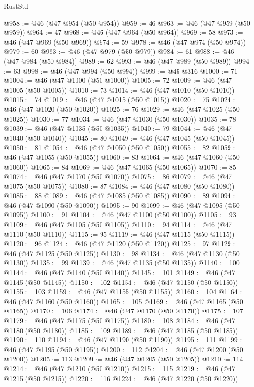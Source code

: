 \begin{lexlean}{RustStd}
\begin{coremodule}
{\begin{coremodule}
{{{{{{{{{{{{{{@958 := @46 (@47 @954 (@50 @954))
@959 := 46
@963 := @46 (@47 @959 (@50 @959))
@964 := 47
@968 := @46 (@47 @964 (@50 @964))
@969 := 58
@973 := @46 (@47 @969 (@50 @969))
@974 := 59
@978 := @46 (@47 @974 (@50 @974))
@979 := 60
@983 := @46 (@47 @979 (@50 @979))
@984 := 61
@988 := @46 (@47 @984 (@50 @984))
@989 := 62
@993 := @46 (@47 @989 (@50 @989))
@994 := 63
@998 := @46 (@47 @994 (@50 @994))
@999 := @46 @316
@1000 := 71
@1004 := @46 (@47 @1000 (@50 @1000))
@1005 := 72
@1009 := @46 (@47 @1005 (@50 @1005))
@1010 := 73
@1014 := @46 (@47 @1010 (@50 @1010))
@1015 := 74
@1019 := @46 (@47 @1015 (@50 @1015))
@1020 := 75
@1024 := @46 (@47 @1020 (@50 @1020))
@1025 := 76
@1029 := @46 (@47 @1025 (@50 @1025))
@1030 := 77
@1034 := @46 (@47 @1030 (@50 @1030))
@1035 := 78
@1039 := @46 (@47 @1035 (@50 @1035))
@1040 := 79
@1044 := @46 (@47 @1040 (@50 @1040))
@1045 := 80
@1049 := @46 (@47 @1045 (@50 @1045))
@1050 := 81
@1054 := @46 (@47 @1050 (@50 @1050))
@1055 := 82
@1059 := @46 (@47 @1055 (@50 @1055))
@1060 := 83
@1064 := @46 (@47 @1060 (@50 @1060))
@1065 := 84
@1069 := @46 (@47 @1065 (@50 @1065))
@1070 := 85
@1074 := @46 (@47 @1070 (@50 @1070))
@1075 := 86
@1079 := @46 (@47 @1075 (@50 @1075))
@1080 := 87
@1084 := @46 (@47 @1080 (@50 @1080))
@1085 := 88
@1089 := @46 (@47 @1085 (@50 @1085))
@1090 := 89
@1094 := @46 (@47 @1090 (@50 @1090))
@1095 := 90
@1099 := @46 (@47 @1095 (@50 @1095))
@1100 := 91
@1104 := @46 (@47 @1100 (@50 @1100))
@1105 := 93
@1109 := @46 (@47 @1105 (@50 @1105))
@1110 := 94
@1114 := @46 (@47 @1110 (@50 @1110))
@1115 := 95
@1119 := @46 (@47 @1115 (@50 @1115))
@1120 := 96
@1124 := @46 (@47 @1120 (@50 @1120))
@1125 := 97
@1129 := @46 (@47 @1125 (@50 @1125))
@1130 := 98
@1134 := @46 (@47 @1130 (@50 @1130))
@1135 := 99
@1139 := @46 (@47 @1135 (@50 @1135))
@1140 := 100
@1144 := @46 (@47 @1140 (@50 @1140))
@1145 := 101
@1149 := @46 (@47 @1145 (@50 @1145))
@1150 := 102
@1154 := @46 (@47 @1150 (@50 @1150))
@1155 := 103
@1159 := @46 (@47 @1155 (@50 @1155))
@1160 := 104
@1164 := @46 (@47 @1160 (@50 @1160))
@1165 := 105
@1169 := @46 (@47 @1165 (@50 @1165))
@1170 := 106
@1174 := @46 (@47 @1170 (@50 @1170))
@1175 := 107
@1179 := @46 (@47 @1175 (@50 @1175))
@1180 := 108
@1184 := @46 (@47 @1180 (@50 @1180))
@1185 := 109
@1189 := @46 (@47 @1185 (@50 @1185))
@1190 := 110
@1194 := @46 (@47 @1190 (@50 @1190))
@1195 := 111
@1199 := @46 (@47 @1195 (@50 @1195))
@1200 := 112
@1204 := @46 (@47 @1200 (@50 @1200))
@1205 := 113
@1209 := @46 (@47 @1205 (@50 @1205))
@1210 := 114
@1214 := @46 (@47 @1210 (@50 @1210))
@1215 := 115
@1219 := @46 (@47 @1215 (@50 @1215))
@1220 := 116
@1224 := @46 (@47 @1220 (@50 @1220))
}}}}}}}}}}}}}}
\end{coremodule}}
\end{coremodule}
\end{lexlean}
